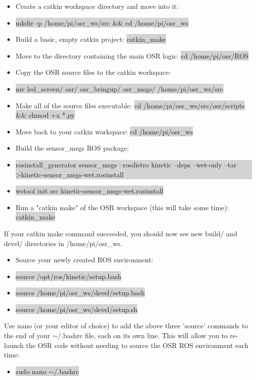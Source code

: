 \documentclass{article}
\begin{document}
\begin{itemize}
	\item[] Create a catkin workspace directory and move into it:
	\item[] \colorbox{lightgray}{mkdir -p /home/pi/osr\_ws/src \&\& cd /home/pi/osr\_ws}
	\item[] Build a basic, empty catkin project: \colorbox{lightgray}{catkin\_make}
	\item[] Move to the directory containing the main OSR logic: \colorbox{lightgray}{cd /home/pi/osr/ROS}
	\item[] Copy the OSR source files to the catkin workspace:
	\item[] \colorbox{lightgray}{mv led\_screen/ osr/ osr\_bringup/ osr\_msgs/ /home/pi/osr\_ws/src}
	\item[] Make all of the source files executable:  \colorbox{lightgray}{cd /home/pi/osr\_ws/src/osr/scripts \&\& chmod +x *.py}
	\item[] Move back to your catkin workspace: \colorbox{lightgray}{cd /home/pi/osr\_ws}
	\item[] Build the sensor\_msgs ROS package:
	\item[] \colorbox{lightgray}{\parbox{0.9\textwidth}{rosinstall\_generator sensor\_msgs --rosdistro kinetic --deps --wet-only --tar \textgreater kinetic-sensor\_msgs-wet.rosinstall}}
	\item[] \colorbox{lightgray}{wstool init src kinetic-sensor\_msgs-wet.rosinstall}
	\item[] Run a "catkin make" of the OSR workspace (this will take some time): \colorbox{lightgray}{catkin\_make}
\end{itemize}

\noindent If your catkin make command succeeded, you should now see new build/ and devel/ directories in /home/pi/osr\_ws.

\begin{itemize}
	\item[] Source your newly created ROS environment: 
	\item[] \colorbox{lightgray}{source /opt/ros/kinetic/setup.bash}
	\item[] \colorbox{lightgray}{source /home/pi/osr\_ws/devel/setup.bash}
	\item[] \colorbox{lightgray}{source /home/pi/osr\_ws/devel/setup.sh}
\end{itemize}

\noindent Use nano (or your editor of choice) to add the above three 'source' commands to the end of your $\sim$/.bashrc file, each on its own line.  This will allow you to re-launch the OSR code without needing to source the OSR ROS environment each time:
\begin{itemize}
	\item[] \colorbox{lightgray}{sudo nano $\sim$/.bashrc}
\end{itemize}
\end{document}
